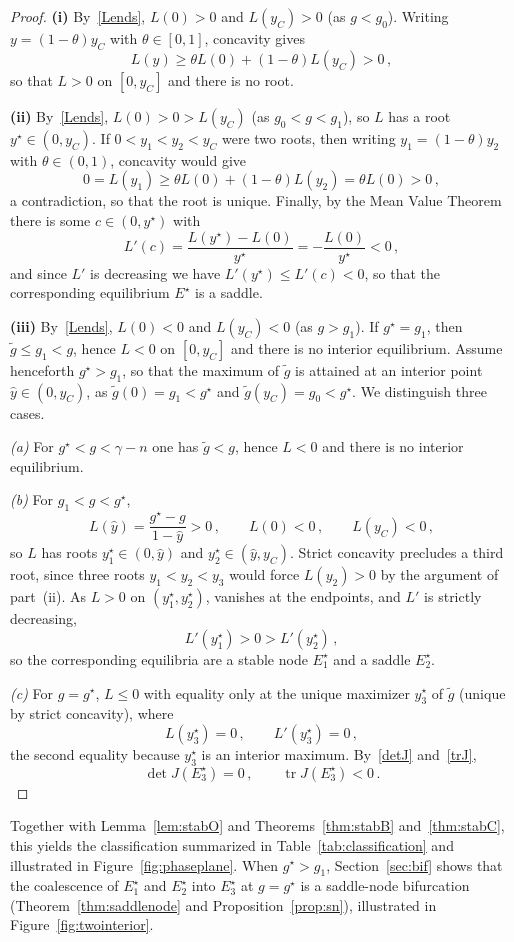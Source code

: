\documentclass[reqno,11pt]{amsart}
\numberwithin{equation}{section}
\begin{document}
\begin{proof}
{\bf (i)} By~\eqref{Lends}, $L(0)>0$ and $L(y_C)>0$ (as $g<g_0$). Writing $y=(1-\theta)y_C$ with $\theta\in[0,1]$, concavity gives
\[
L(y)\ge\theta L(0)+(1-\theta)L(y_C)>0\,,
\]
so that $L>0$ on $[0,y_C]$ and there is no root.

{\bf (ii)} By~\eqref{Lends}, $L(0)>0>L(y_C)$ (as $g_0<g<g_1$), so $L$ has a root $y^\star\in(0,y_C)$. If $0<y_1<y_2<y_C$ were two roots, then writing $y_1=(1-\theta)y_2$ with $\theta\in(0,1)$, concavity would give
\[
0=L(y_1)\ge\theta L(0)+(1-\theta)L(y_2)=\theta L(0)>0\,,
\]
a contradiction, so that the root is unique. Finally, by the Mean Value Theorem there is some $c\in(0,y^\star)$ with
\[
L'(c)=\frac{L(y^\star)-L(0)}{y^\star}=-\frac{L(0)}{y^\star}<0\,,
\]
and since $L'$ is decreasing we have $L'(y^\star)\le L'(c)<0$, so that the corresponding equilibrium $E^\star$ is a saddle.

{\bf (iii)} By~\eqref{Lends}, $L(0)<0$ and $L(y_C)<0$ (as $g>g_1$). If $g^\star=g_1$, then $\tilde g\le g_1<g$, hence $L<0$ on $[0,y_C]$ and there is no interior equilibrium. Assume henceforth $g^\star>g_1$, so that the maximum of $\tilde g$ is attained at an interior point $\hat y\in(0,y_C)$, as $\tilde g(0)=g_1<g^\star$ and $\tilde g(y_C)=g_0<g^\star$. We distinguish three cases.

\emph{(a)} For $g^\star<g<\gamma-n$ one has $\tilde g<g$, hence $L<0$ and there is no interior equilibrium.

\emph{(b)} For $g_1<g<g^\star$,
\[
L(\hat y)=\frac{g^\star-g}{1-\hat y}>0\,,\qquad L(0)<0\,,\qquad L(y_C)<0\,,
\]
so $L$ has roots $y_1^\star\in(0,\hat y)$ and $y_2^\star\in(\hat y,y_C)$. Strict concavity precludes a third root, since three roots $y_1<y_2<y_3$ would force $L(y_2)>0$ by the argument of part~(ii). As $L>0$ on $(y_1^\star,y_2^\star)$, vanishes at the endpoints, and $L'$ is strictly decreasing,
\[
L'(y_1^\star)>0>L'(y_2^\star)\,,
\]
so the corresponding equilibria are a stable node $E_1^\star$ and a saddle $E_2^\star$.

\emph{(c)} For $g=g^\star$, $L\le0$ with equality only at the unique maximizer $y_3^\star$ of $\tilde g$ (unique by strict concavity), where
\[
L(y_3^\star)=0\,,\qquad L'(y_3^\star)=0\,,
\]
the second equality because $y_3^\star$ is an interior maximum. By~\eqref{detJ} and~\eqref{trJ},
\[
\det J(E_3^\star)=0\,,\qquad \operatorname{tr}J(E_3^\star)<0\,.
\]
\end{proof}

Together with Lemma~\ref{lem:stabO} and Theorems~\ref{thm:stabB} and~\ref{thm:stabC}, this yields the  classification summarized in Table~\ref{tab:classification} and illustrated in Figure~\ref{fig:phaseplane}. When $g^\star>g_1$, Section~\ref{sec:bif} shows that the coalescence of $E_1^\star$ and $E_2^\star$ into $E_3^\star$ at $g=g^\star$ is a saddle-node bifurcation (Theorem~\ref{thm:saddlenode} and Proposition~\ref{prop:sn}), illustrated in Figure~\ref{fig:twointerior}. 
\end{document}

